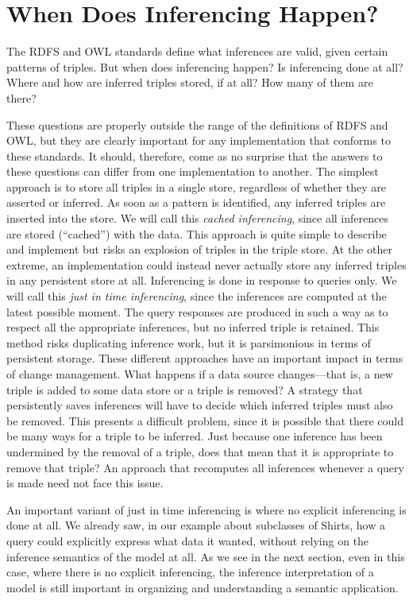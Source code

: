 \section{When Does Inferencing Happen?}

The RDFS and OWL standards define what inferences are valid, given
certain patterns of triples. But when does inferencing happen? Is
inferencing done at all? Where and how are inferred triples stored, if
at all? How many of them are there?

These questions are properly outside the range of the definitions of
RDFS and OWL, but they are clearly important for any implementation that
conforms to these standards. It should, therefore, come as no surprise
that the answers to these questions can differ from one implementation
to another. The simplest approach is to store all triples in a single
store, regardless of whether they are asserted or inferred. As soon as a
pattern is identified, any inferred triples are inserted into the store.
We will call this \emph{cached inferencing}, since all inferences are
stored (``cached'') with the data. This approach is quite simple to
describe and implement but risks an explosion of triples in the triple
store. At the other extreme, an implementation could instead never
actually store any inferred triples in any persistent store at all.
Inferencing is done in response to queries only. We will call this
\emph{just in time inferencing}, since the inferences are computed at
the latest possible moment. The query responses are produced in such a
way as to respect all the appropriate inferences, but no inferred triple
is retained. This method risks duplicating inference work, but it is
parsimonious in terms of persistent storage. These different approaches
have an important impact in terms of change management. What happens if
a data source changes---that is, a new triple is added to some data
store or a triple is removed? A strategy that persistently saves
inferences will have to decide which inferred triples must also be
removed. This presents a difficult problem, since it is possible that
there could be many ways for a triple to be inferred. Just because one
inference has been undermined by the removal of a triple, does that mean
that it is appropriate to remove that triple? An approach that
recomputes all inferences whenever a query is made need not face this
issue.

An important variant of just in time inferencing is where no explicit
inferencing is done at all. We already saw, in our example about
subclasses of Shirts, how a query could explicitly express what data it
wanted, without relying on the inference semantics of the model at all.
As we see in the next section, even in this case, where there is no
explicit inferencing, the inference interpretation of a model is still
important in organizing and understanding a semantic application.

